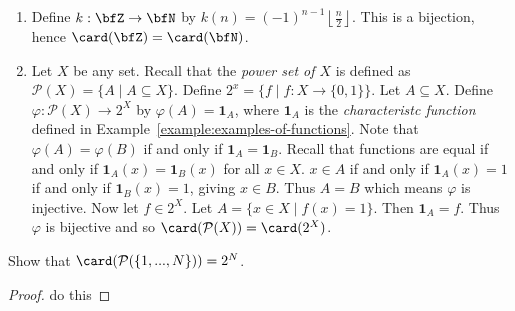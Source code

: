         \begin{example}\label{example:more-cardinality-examples}
            \phantom{a}
            \begin{enumerate}[label = (\arabic*)]
                \item Define $k:\bfZ \rightarrow \bfN$ by $k(n) = (-1)^{n-1} \left\lfloor \frac{n}{2} \right \rfloor$. This is a bijection, hence $\card(\bfZ) = \card(\bfN)$.
                \item Let $X$ be any set. Recall that the \textit{power set of $X$} is defined as $\mathcal{P}(X) = \{A \mid A \subseteq X\}$. Define $2^x = \{f \mid f:X \rightarrow \{0,1\}\}$. Let $A \subseteq X$. Define $\varphi:\mathcal{P}(X) \rightarrow 2^X$ by $\varphi(A) = \mathbf{1}_A$, where $\mathbf{1}_A$ is the \textit{characteristc function} defined in Example~\ref{example:examples-of-functions}. Note that $\varphi(A) = \varphi(B)$ if and only if $\mathbf{1}_A = \mathbf{1}_B$. Recall that functions are equal if and only if $\mathbf{1}_A (x) = \mathbf{1}_B (x)$ for all $x \in X$. $x \in A$ if and only if $\mathbf{1}_A (x) = 1$ if and only if $\mathbf{1}_B(x) = 1$, giving $x \in B$. Thus $A = B$ which means $\varphi$ is injective. Now let $f \in 2^X$. Let $A = \{x \in X \mid f(x) =1\}$. Then $\mathbf{1}_A = f$. Thus $\varphi$ is bijective and so $\card(\mathcal{P}(X)) = \card(2^X)$.
            \end{enumerate}
        \end{example}

    \begin{exercise}\label{exercise:power-set-2n}
        Show that $\card(\mathcal{P}(\{1,...,N\})) = 2^N$.
    \end{exercise}
        \begin{proof}
            {\color{red} do this}
        \end{proof}

